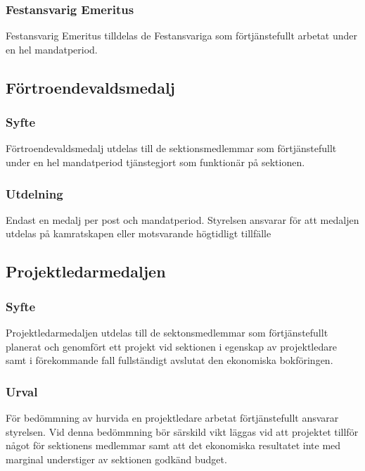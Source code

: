\documentclass{../resources/dgovdoc}
\begin{document}
\subsubsection{Festansvarig Emeritus}

Festansvarig Emeritus tilldelas de Festansvariga som förtjänstefullt arbetat under en hel mandatperiod.

\subsection{Förtroendevaldsmedalj}

\subsubsection{Syfte}

Förtroendevaldsmedalj utdelas till de sektionsmedlemmar som förtjänstefullt under en hel mandatperiod tjänstegjort som funktionär på sektionen. 

\subsubsection{Utdelning}

Endast en medalj per post och mandatperiod. Styrelsen ansvarar för att medaljen utdelas på kamratskapen eller motsvarande högtidligt tillfälle

\subsection{Projektledarmedaljen}

\subsubsection{Syfte}

Projektledarmedaljen utdelas till de sektonsmedlemmar som förtjänstefullt planerat och genomfört ett projekt vid sektionen i egenskap av projektledare samt i förekommande fall fullständigt avslutat den ekonomiska bokföringen. 

\subsubsection{Urval}

För bedömmning av hurvida en projektledare arbetat förtjänstefullt ansvarar styrelsen. Vid denna bedömmning bör särskild vikt läggas vid att projektet tillför något för sektionens medlemmar samt att det ekonomiska resultatet inte med marginal understiger av sektionen godkänd budget. 
\end{document}
